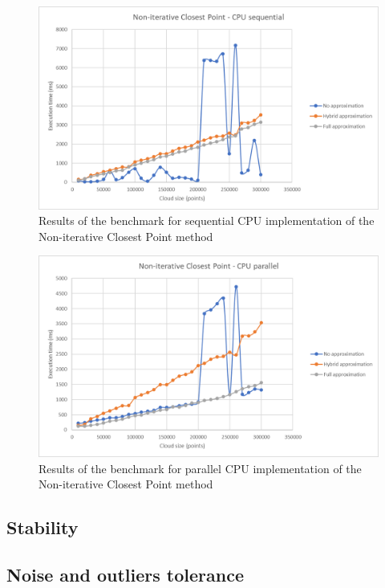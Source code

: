 \documentclass[titlepage]{article}
\begin{document}
\begin{figure}[H]
\includegraphics[width=\textwidth]{ms-nicp-1.png}
\caption{Results of the benchmark for sequential CPU implementation of the Non-iterative Closest Point method}
\end{figure}

\begin{figure}[H]
\includegraphics[width=\textwidth]{ms-nicp-2.png}
\caption{Results of the benchmark for parallel CPU implementation of the Non-iterative Closest Point method}
\end{figure}

\subsection{Stability}

\subsection{Noise and outliers tolerance}
\end{document}
